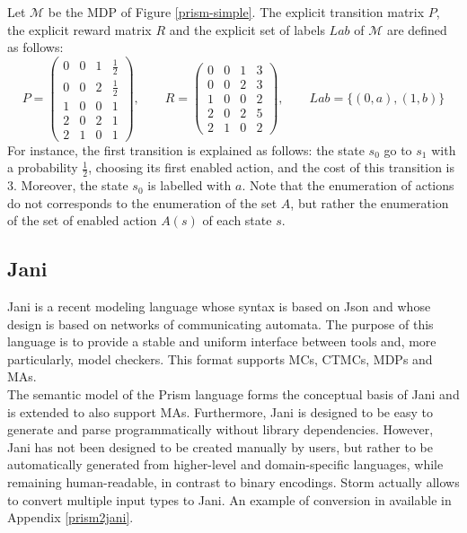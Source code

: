 \begin{example}
Let $\mathcal{M}$ be the MDP of Figure \ref{prism-simple}. The explicit transition matrix $P$, the explicit reward matrix $R$ and the explicit set of labels $Lab$ of $\mathcal{M}$ are defined as follows:
  \begin{equation*}
  P =
  	\begin{pmatrix}
  	0 & 0 & 1 & \frac{1}{2} \\[0.3em]
  	0 & 0 & 2 & \frac{1}{2} \\[0.3em]
  	1 & 0 & 0 & 1 \\[0.3em]
    2 & 0 & 2 & 1 \\[0.3em]
    2 & 1 & 0 & 1
  	\end{pmatrix}, \quad \quad
  R =
    \begin{pmatrix}
  	0 & 0 & 1 & 3 \\[0.3em]
  	0 & 0 & 2 & 3 \\[0.3em]
  	1 & 0 & 0 & 2 \\[0.3em]
    2 & 0 & 2 & 5 \\[0.3em]
    2 & 1 & 0 & 2
    \end{pmatrix}, \quad \quad
  Lab = \{ (0, a), (1, b) \}
  \end{equation*}
For instance, the first transition is explained as follows: the state $s_0$ go to $s_1$ with a probability $\frac{1}{2}$, choosing its first enabled action, and the cost of this transition is $3$.
Moreover, the state $s_0$ is labelled with $a$.
Note that the enumeration of actions do not corresponds to the enumeration of the set $A$, but rather the enumeration of the set of enabled action $A(s)$ of each state $s$.
\end{example}

\subsection{Jani}
Jani \cite{JQM} is a recent modeling language whose syntax is based on Json and whose design is based on networks of communicating automata.
The purpose of this language is to provide a stable and uniform interface
between tools and, more particularly, model checkers.
This format supports MCs, CTMCs, MDPs and MAs. \\

The semantic model of the Prism language forms the conceptual basis of
Jani and is extended to also support MAs.
Furthermore, Jani is designed
to be easy to generate and parse programmatically without library dependencies.
However, Jani has not been designed to be created manually by users, but rather
to be automatically generated from higher-level and domain-specific languages, while remaining human-readable, in contrast to binary encodings. Storm actually allows to
convert multiple input types to Jani. An example of conversion in available in Appendix \ref{prism2jani}.


